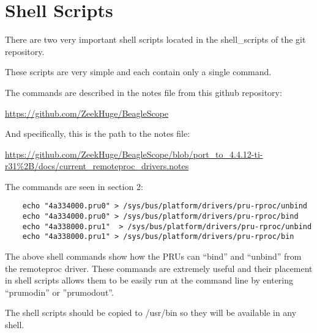%
%
%

\chapter{Shell Scripts}

There are two very important shell scripts located in the shell\_scripts of the git repository.

These scripts are very simple and each contain only a single command.

The commands are described in the notes file from this github repository:

\url{https://github.com/ZeekHuge/BeagleScope}

And specifically, this is the path to the notes file:

\url{https://github.com/ZeekHuge/BeagleScope/blob/port_to_4.4.12-ti-r31%2B/docs/current_remoteproc_drivers.notes} 
	
	The commands are seen in section 2:
	
	\begin{verbatim}
	echo "4a334000.pru0" > /sys/bus/platform/drivers/pru-rproc/unbind
	echo "4a334000.pru0" > /sys/bus/platform/drivers/pru-rproc/bind
	echo "4a338000.pru1"  > /sys/bus/platform/drivers/pru-rproc/unbind
	echo "4a338000.pru1" > /sys/bus/platform/drivers/pru-rproc/bin
	\end{verbatim}
	
	The above shell commands show how the PRUs can ``bind'' and ``unbind'' from the remoteproc driver.  These commands are extremely useful and their placement in shell scripts allows them to be easily run at the command line by entering ``prumodin'' or ''prumodout''.
	
	The shell scripts should be copied to /usr/bin so they will be available in any shell.
